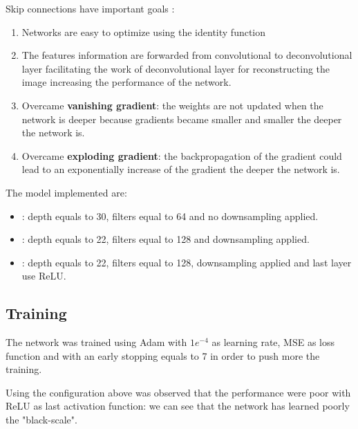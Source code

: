 Skip connections have important goals \cite{resnet}:
\begin{enumerate}
    \item Networks are easy to optimize using the identity function
    \item The features information are forwarded from convolutional to deconvolutional layer facilitating the work of deconvolutional layer for reconstructing the image increasing the performance of the network.
    \item Overcame \textbf{vanishing gradient}: the weights are not updated when the network is deeper because gradients became smaller and smaller the deeper the network is.
    \item Overcame \textbf{exploding gradient}: the backpropagation of the gradient could lead to an exponentially increase of the gradient the deeper the network is.
\end{enumerate}


The model implemented are: 

\begin{itemize}
    \item \textbf{}: depth equals to 30, filters equal to 64 and no downsampling applied.
    \item \textbf{}: depth equals to 22, filters equal to 128 and downsampling applied.\item \textbf{}: depth equals to 22, filters equal to 128, downsampling applied and last layer use ReLU.
\end{itemize}

\subsection{Training}\label{caessctraining:training}
The network was trained using Adam\cite{adam} with $1e^{-4}$ as learning rate, MSE as loss function and with an early stopping equals to 7 in order to push more the training.

Using the configuration above was observed that the performance were poor with ReLU as last activation function: we can see that the network has learned poorly the "black-scale".

